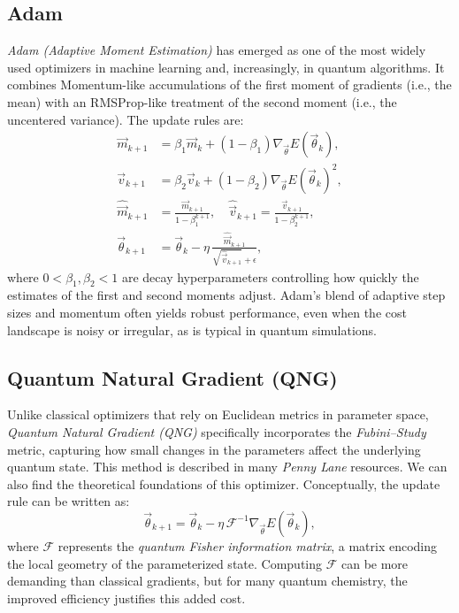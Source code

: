 \subsection{Adam}
\label{subsec:adam}
\emph{Adam (Adaptive Moment Estimation)} has emerged as one of the most widely used optimizers in machine learning and, increasingly, in quantum algorithms. It combines Momentum-like accumulations of the first moment of gradients (i.e., the mean) with an RMSProp-like treatment of the second moment (i.e., the uncentered variance). The update rules are:
\[
\begin{aligned}
\vec{m}_{k+1} &= \beta_1 \vec{m}_{k} 
+ (1-\beta_1) \nabla_{\vec{\theta}} E(\vec{\theta}_{k}), \\
\vec{v}_{k+1} &= \beta_2 \vec{v}_{k} 
+ (1-\beta_2) \nabla_{\vec{\theta}} E(\vec{\theta}_{k})^2, \\
\hat{\vec{m}}_{k+1} &= \frac{\vec{m}_{k+1}}{1-\beta_1^{k+1}}, \quad
\hat{\vec{v}}_{k+1} = \frac{\vec{v}_{k+1}}{1-\beta_2^{k+1}}, \\
\vec{\theta}_{k+1} &= \vec{\theta}_{k} 
- \eta \,\frac{\hat{\vec{m}}_{k+1}}
{\sqrt{\hat{\vec{v}}_{k+1}} + \epsilon},
\end{aligned}
\]
where \(0 < \beta_1, \beta_2 < 1\) are decay hyperparameters controlling how quickly the estimates of the first and second moments adjust. Adam’s blend of adaptive step sizes and momentum often yields robust performance, even when the cost landscape is noisy or irregular, as is typical in quantum simulations.

\subsection{Quantum Natural Gradient (QNG)}
\label{subsec:qng}
Unlike classical optimizers that rely on Euclidean metrics in parameter space, \emph{Quantum Natural Gradient (QNG)} specifically incorporates the \emph{Fubini--Study} metric, capturing how small changes in the parameters affect the underlying quantum state. This method is described in many \textit{Penny Lane} resources. We can also find the theoretical foundations of this optimizer.\cite{pennylane_qngoptimizer} Conceptually, the update rule can be written as:
\[
\vec{\theta}_{k+1}
= \vec{\theta}_{k}
- \eta \, \mathcal{F}^{-1} \nabla_{\vec{\theta}} E(\vec{\theta}_{k}),
\]
where \(\mathcal{F}\) represents the \emph{quantum Fisher information matrix}, a matrix encoding the local geometry of the parameterized state. Computing \(\mathcal{F}\) can be more demanding than classical gradients, but for many quantum chemistry, the improved efficiency justifies this added cost.

